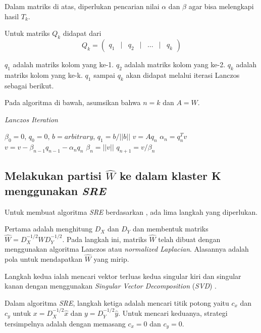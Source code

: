 Dalam matriks di atas, diperlukan pencarian nilai $\alpha$ dan $\beta$ agar bisa melengkapi hasil $T_k$.

Untuk matriks $Q_k$ didapat dari
\begin{equation*}
    Q_k = \begin{pmatrix}
q_1 &|& q_2 &|& \dots &|& q_k
\end{pmatrix}
\end{equation*}

$q_1$ adalah matriks kolom yang ke-1. $q_2$ adalah matriks kolom yang ke-2. $q_k$ adalah matriks kolom yang ke-k. $q_1$ sampai $q_k$ akan didapat melalui iterasi Lanczos sebagai berikut.

Pada algoritma di bawah, asumsikan bahwa $n = k$ dan $A = W$.

\begin{algorithm}[H]
    \caption{\textit{Lanczos Iteration} \citep*{golub_matrix_computation_3_edition}}\label{alg:lanczos}
    \begin{algorithmic}
        \Require $\beta_0 = 0$, $q_0 = 0$, $b = arbitrary$, $q_1 = b/||b||$
        \State $v = Aq_n$
        \State $\alpha_n = q_n^Tv $
        \State $v = v - \beta_{n-1} q_{n-1} - \alpha_n q_n $
        \State $\beta_n = ||v|| $ 
        \State $q_{n+1} = v/\beta_n $
        \EndWhile
    \end{algorithmic}
\end{algorithm}

\subsection{Melakukan partisi $\hat{W}$ ke dalam klaster K menggunakan \textit{SRE}}

Untuk membuat algoritma \textit{SRE} berdasarkan \cite{zha2001bgp}, ada lima langkah yang diperlukan.

Pertama adalah menghitung $D_X$ dan $D_Y$ dan membentuk matriks $\hat{W} = D_X^{-1/2}WD_Y^{-1/2}$. Pada langkah ini, matriks $\hat{W}$ telah dibuat dengan menggunakan algoritma Lanczos atau \textit{normalized Laplacian}. Alasannya adalah pola untuk mendapatkan $\hat{W}$ yang mirip.

Langkah kedua ialah mencari vektor terluas kedua singular kiri dan singular kanan dengan menggunakan \emph{Singular Vector Decomposition} (\emph{SVD}) .

Dalam algoritma \textit{SRE}, langkah ketiga adalah mencari titik potong yaitu $c_x$ dan $c_y$ untuk $x = D_X^{-1/2}\hat{x}$ dan $y = D_Y^{-1/2}\hat{y}$. Untuk mencari keduanya, strategi tersimpelnya adalah dengan memasang $c_x = 0$ dan $c_y = 0$. 


